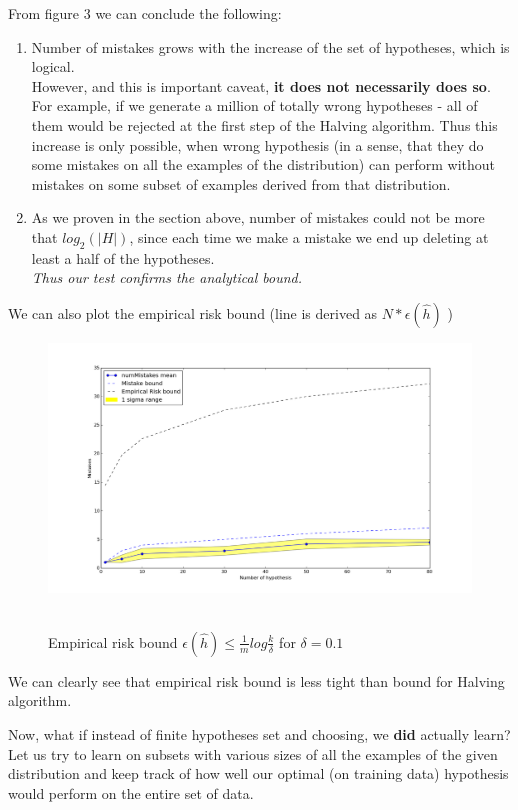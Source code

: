 \documentclass{article}
\begin{document}
From figure 3 we can conclude the following:
\begin{enumerate}
	\item Number of mistakes grows with the increase of the set of hypotheses, which is logical. \\
	However, and this is important caveat, \textbf{it does not necessarily does so}. For example, if we generate a million of totally wrong hypotheses - all of them would be rejected at the first step of the Halving algorithm. Thus this increase is only possible, when wrong hypothesis (in a sense, that they do some mistakes on all the examples of the distribution) can perform without mistakes on some subset of examples derived from that distribution.  
	\item As we proven in the section above, number of mistakes could not be more that $log_2(|H|)$, since each time we make a mistake we end up deleting at least a half of the hypotheses. \\
	\textit{Thus our test confirms the analytical bound. }
\end{enumerate}

\pagebreak
We can also plot the empirical risk bound (line is derived as $N * \epsilon (\hat{h})$ )

\begin{figure}[!htb]
	\centering
	\includegraphics[width=6.4in,clip,keepaspectratio]{emp_risk_bound_w_emp_risk.png}\
	\caption{Empirical risk bound $\epsilon (\hat{h}) \le \frac{1}{m} log \frac{k}{\delta}$ for $\delta=0.1$}	
\end{figure} 
We can clearly see that empirical risk bound is less tight than bound for Halving algorithm. 

Now, what if instead of finite hypotheses set and choosing, we \textbf{did} actually learn? Let us try to learn on subsets with various sizes of all the examples of the given distribution and keep track of how well our optimal (on training data) hypothesis would perform on the entire set of data.
\end{document}
